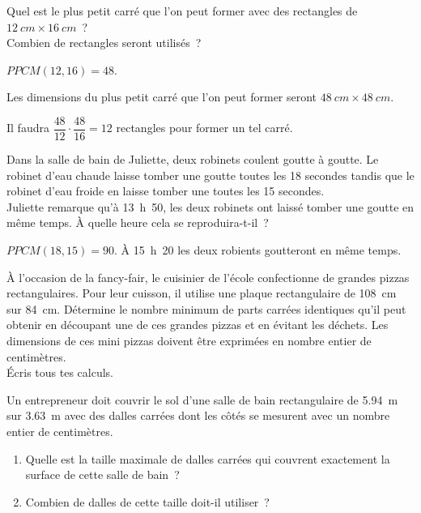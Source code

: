 \documentclass[../../syllabus_2.tex]{subfiles}
\begin{document}
\begin{exercise}
    Quel est le plus petit carré que l'on peut former avec des rectangles de \(\SI{12}{cm}\times\SI{16}{cm}\)~? \\ Combien de rectangles seront utilisés~?
\end{exercise}
\begin{solution}
    \(PPCM(12,16) = 48\). 

    Les dimensions du plus petit carré que l'on peut former seront \(\SI{48}{cm}\times\SI{48}{cm}\).

    Il faudra \(\dfrac{48}{12}\cdot\dfrac{48}{16} = 12\) rectangles pour former un tel carré.
\end{solution}

\begin{exercise}
    Dans la salle de bain de Juliette, deux robinets coulent goutte à goutte. Le robinet d'eau chaude laisse tomber une goutte toutes les 18 secondes tandis que le robinet d'eau froide en laisse tomber une toutes les 15 secondes.\\
    Juliette remarque qu'à 13~h~50, les deux robinets ont laissé tomber une goutte en même temps. À quelle heure cela se reproduira-t-il~?
\end{exercise}
\begin{solution}
    \(PPCM(18,15)= 90\). À 15~h~20 les deux robients goutteront en même temps.
\end{solution}

\begin{exercise}
    À l'occasion de la fancy-fair, le cuisinier de l'école confectionne de grandes pizzas rectangulaires. Pour leur cuisson, il utilise une plaque rectangulaire de \SI{108}{cm} sur \SI{84}{cm}. Détermine le nombre minimum de parts carrées identiques qu'il peut obtenir en découpant une de ces grandes pizzas et en évitant les déchets. Les dimensions de ces mini pizzas doivent être exprimées en nombre entier de centimètres. \\
    Écris tous tes calculs.
\end{exercise}

\begin{exercise}
    Un entrepreneur doit couvrir le sol d'une salle de bain rectangulaire de \SI{5,94}{m} sur \SI{3,63}{m} avec des dalles carrées dont les côtés se mesurent avec un nombre entier de centimètres.
    \begin{enumerate}
        \item Quelle est la taille maximale de dalles carrées qui couvrent exactement la surface de cette salle de bain~?
        \item Combien de dalles de cette taille doit-il utiliser~?
    \end{enumerate}
\end{exercise}
\end{document}
